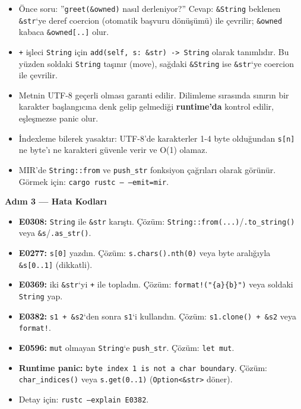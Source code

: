 \documentclass[12pt,a4paper]{article}
\begin{document}
\begin{itemize}
\tightlist
\item
  Önce soru: ''\texttt{greet(\&owned)} nasıl derleniyor?'' Cevap: \texttt{\&String} beklenen \texttt{\&str}`ye deref coercion (otomatik başvuru dönüşümü) ile çevrilir; \texttt{\&owned} kabaca \texttt{\&owned{[}..{]}} olur.
\item
  \texttt{+} işleci \texttt{String} için \texttt{add(self,\ s:\ \&str)\ -\textgreater{}\ String} olarak tanımlıdır. Bu yüzden soldaki \texttt{String} taşınır (move), sağdaki \texttt{\&String} ise \texttt{\&str}`ye coercion ile çevrilir.
\item
  Metnin UTF-8 geçerli olması garanti edilir. Dilimleme sırasında sınırın bir karakter başlangıcına denk gelip gelmediği \textbf{runtime'da} kontrol edilir, eşleşmezse panic olur.
\item
  İndexleme bilerek yasaktır: UTF-8'de karakterler 1-4 byte olduğundan \texttt{s{[}n{]}} ne byte'ı ne karakteri güvenle verir ve O(1) olamaz.
\item
  MIR'de \texttt{String::from} ve \texttt{push\_str} fonksiyon çağrıları olarak görünür. Görmek için: \texttt{cargo\ rustc\ --\ --emit=mir}.
\end{itemize}

\textbf{Adım 3 --- Hata Kodları}

\begin{itemize}
\tightlist
\item
  \textbf{E0308:} \texttt{String} ile \texttt{\&str} karıştı. Çözüm: \texttt{String::from(...)}/\texttt{.to\_string()} veya \texttt{\&s}/\texttt{.as\_str()}.
\item
  \textbf{E0277:} \texttt{s{[}0{]}} yazdın. Çözüm: \texttt{s.chars().nth(0)} veya byte aralığıyla \texttt{\&s{[}0..1{]}} (dikkatli).
\item
  \textbf{E0369:} iki \texttt{\&str}`yi \texttt{+} ile topladın. Çözüm: \texttt{format!("\{a\}\{b\}")} veya soldaki \texttt{String} yap.
\item
  \textbf{E0382:} \texttt{s1\ +\ \&s2}`den sonra \texttt{s1}`i kullandın. Çözüm: \texttt{s1.clone()\ +\ \&s2} veya \texttt{format!}.
\item
  \textbf{E0596:} \texttt{mut} olmayan \texttt{String}`e \texttt{push\_str}. Çözüm: \texttt{let\ mut}.
\item
  \textbf{Runtime panic:} \texttt{byte\ index\ 1\ is\ not\ a\ char\ boundary}. Çözüm: \texttt{char\_indices()} veya \texttt{s.get(0..1)} (\texttt{Option\textless{}\&str\textgreater{}} döner).
\item
  Detay için: \texttt{rustc\ --explain\ E0382}.
\end{itemize}
\end{document}
